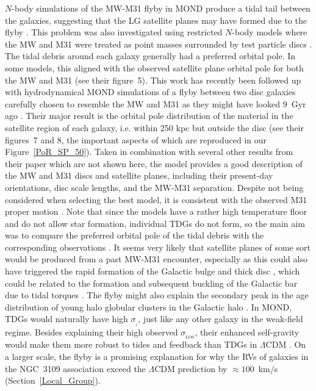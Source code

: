 \documentclass[fleqn,usenatbib,useAMS,onecolumn]{mnras} %
\begin{document}
$N$-body simulations of the MW-M31 flyby in MOND produce a tidal tail between the galaxies, suggesting that the LG satellite planes may have formed due to the flyby \citep{Bilek_2018}. This problem was also investigated using restricted $N$-body models where the MW and M31 were treated as point masses surrounded by test particle discs \citep{Banik_Ryan_2018}. The tidal debris around each galaxy generally had a preferred orbital pole. In some models, this aligned with the observed satellite plane orbital pole for both the MW and M31 (see their figure~5). This work has recently been followed up with hydrodynamical MOND simulations of a flyby between two disc galaxies carefully chosen to resemble the MW and M31 as they might have looked 9~Gyr ago \citep{Banik_2022_satellite_plane}. Their major result is the orbital pole distribution of the material in the satellite region of each galaxy, i.e. within 250 kpc but outside the disc (see their figures~7 and 8, the important aspects of which are reproduced in our Figure~\ref{PoR_SP_50}). Taken in combination with several other results from their paper which are not shown here, the model provides a good description of the MW and M31 discs and satellite planes, including their present-day orientations, disc scale lengths, and the MW-M31 separation. Despite not being considered when selecting the best model, it is consistent with the observed M31 proper motion \citep{Salomon_2021}. Note that since the models have a rather high temperature floor and do not allow star formation, individual TDGs do not form, so the main aim was to compare the preferred orbital pole of the tidal debris with the corresponding observations \citep{Pawlowski_2013_LG, Pawlowski_2013_VPOS}. It seems very likely that satellite planes of some sort would be produced from a past MW-M31 encounter, especially as this could also have triggered the rapid formation of the Galactic bulge \citep{Ballero_2007} and thick disc \citep{Kilic_2017}, which could be related to the formation and subsequent buckling of the Galactic bar due to tidal torques \citep{Grady_2020}. The flyby might also explain the secondary peak in the age distribution of young halo globular clusters in the Galactic halo \citep[figure~9 of][]{Mackey_2004}. In MOND, TDGs would naturally have high $\sigma_{_i}$, just like any other galaxy in the weak-field regime. Besides explaining their high observed $\sigma_{_\text{LOS}}$, their enhanced self-gravity would make them more robust to tides and feedback than TDGs in $\Lambda$CDM \citep{Renaud_2016}. On a larger scale, the flyby is a promising explanation for why the RVs of galaxies in the NGC~3109 association exceed the $\Lambda$CDM prediction by $\approx 100$~km/s (Section~\ref{Local_Group}).
\end{document}
